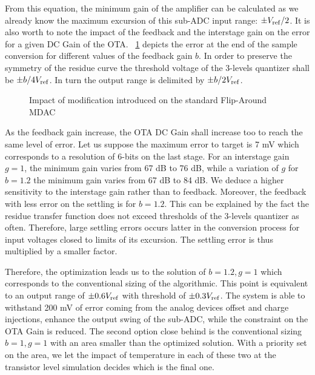 From this equation, the minimum gain of the amplifier can be calculated as we already know the maximum excursion of this sub-ADC input range: \(\pm V_{\rm ref}/2\). It is also worth to note the impact of the feedback and the interstage gain on the error for a given DC Gain of the OTA\@. \figurename~\ref{fig:algo-cb-impact} depicts the error at the end of the sample conversion for different values of the feedback gain \(b\). In order to preserve the symmetry of the residue curve the threshold voltage of the 3-levels quantizer shall be \(\pm b/4 V_{\rm ref}\). In turn the output range is delimited by \(\pm b/2 V_{\rm ref}\). 

\begin{figure}[htp]
	\centering
	\begin{subfigure}[b]{0.45\textwidth}
		\centering
		\resizebox{\textwidth}{!}{
			
		}
		\label{fig:algo-cb-impact}
	\end{subfigure}
	\begin{subfigure}[b]{0.45\textwidth}
		\centering
		\resizebox{\textwidth}{!}{
			
		}
		\label{fig:algo-cg-impact}
	\end{subfigure}
	\caption{Impact of modification introduced on the standard Flip-Around MDAC}
	\label{fig:algo-error-cb-cg}
\end{figure}

As the feedback gain increase, the OTA DC Gain shall increase too to reach the same level of error. Let us suppose the maximum error to target is 7 mV which corresponds to a resolution of 6-bits on the last stage. For an interstage gain \(g = 1\), the minimum gain varies from 67 dB to 76 dB, while a variation of \(g\) for \(b = 1.2\) the minimum gain varies from 67 dB to 84 dB. We deduce a higher sensitivity to the interstage gain rather than to feedback. Moreover, the feedback with less error on the settling is for \(b = 1.2\). This can be explained by the fact the residue transfer function does not exceed thresholds of the 3-levels quantizer as often. Therefore, large settling errors occurs latter in the conversion process for input voltages closed to limits of its excursion. The settling error is thus multiplied by a smaller factor.

Therefore, the optimization leads us to the solution of \(b = 1.2, g = 1\) which corresponds to the conventional sizing of the algorithmic. This point is equivalent to an output range of \(\pm 0.6 V_{\rm ref}\) with threshold of \(\pm 0.3 V_{\rm ref}\). The system is able to withstand 200 mV of error coming from the analog devices offset and charge injections, enhance the output swing of the sub-ADC, while the constraint on the OTA Gain is reduced. The second option close behind is the conventional sizing \(b = 1, g = 1\) with an area smaller than the optimized solution. With a priority set on the area, we let the impact of temperature in each of these two at the transistor level simulation decides which is the final one.

